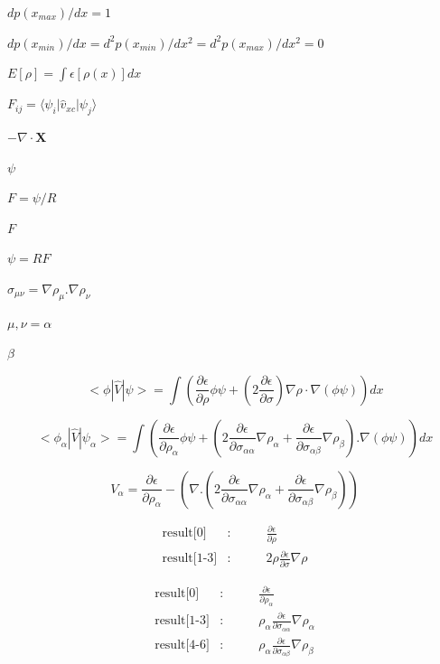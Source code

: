 \documentclass{article}
\begin{document}
$dp(x_{max})/dx=1$
\pagebreak

$dp(x_{min})/dx=d^2p(x_{min})/dx^2=d^2p(x_{max})/dx^2=0$
\pagebreak

$ E[\rho] = \int \epsilon[\rho(x)] dx$
\pagebreak

$ F_{ij} = \langle\psi_i|\hat v_{xc}|\psi_j\rangle $
\pagebreak

$ -\nabla\cdot\mathbf X $
\pagebreak

$\psi$
\pagebreak

$ F=\psi/R $
\pagebreak

$ F $
\pagebreak

$ \psi = RF $
\pagebreak

$ \sigma_{\mu \nu} = \nabla \rho_{\mu} . \nabla \rho_{\nu} $
\pagebreak

$ \mu, \nu = \alpha$
\pagebreak

$ \beta $
\pagebreak

\[
  < \phi | \hat V | \psi > = \int \left( \frac{\partial \epsilon}{\partial \rho} \phi \psi
                 +  \left( 2 \frac{\partial \epsilon}{\partial \sigma} \right)
                 \nabla \rho \cdot \nabla \left( \phi \psi \right) \right) dx
\]
\pagebreak

\[
  < \phi_{\alpha} | \hat V | \psi_{\alpha} > = \int \left( \frac{\partial \epsilon}{\partial \rho_{\alpha}} \phi \psi
           +  \left( 2 \frac{\partial \epsilon}{\partial \sigma_{\alpha \alpha}} \nabla \rho_{\alpha}
           + \frac{\partial \epsilon}{\partial \sigma_{\alpha \beta}} \nabla \rho_{\beta}  \right) . \nabla \left( \phi \psi \right) \right) dx
\]
\pagebreak

\[
   V_{\alpha} =  \frac{\partial \epsilon}{\partial \rho_{\alpha}}
                 - \left(\nabla . \left(2 \frac{\partial \epsilon}{\partial \sigma_{\alpha \alpha}} \nabla \rho_{\alpha}
                 + \frac{\partial \epsilon}{\partial \sigma_{\alpha \beta}} \nabla \rho_{\beta}  \right)  \right)
\]
\pagebreak

\begin{eqnarray*}
    \mbox{result[0]}    &:& \qquad \frac{\partial \epsilon}{\partial \rho} \\
    \mbox{result[1-3]}  &:& \qquad 2 \rho \frac{\partial \epsilon}{\partial \sigma} \nabla\rho
\end{eqnarray*}
\pagebreak

\begin{eqnarray*}
    \mbox{result[0]}    &:& \qquad \frac{\partial \epsilon}{\partial \rho_{\alpha}} \\
    \mbox{result[1-3]}  &:& \qquad \rho_\alpha \frac{\partial \epsilon}{\partial \sigma_{\alpha \alpha}} \nabla\rho_\alpha\\
    \mbox{result[4-6]}  &:& \qquad \rho_\alpha \frac{\partial \epsilon}{\partial \sigma_{\alpha \beta}} \nabla\rho_\beta
\end{eqnarray*}
\pagebreak
\end{document}

